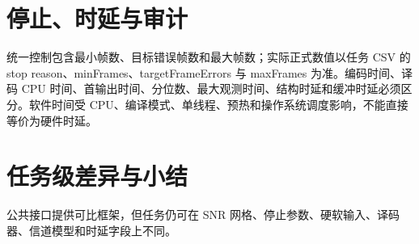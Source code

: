 \section{停止、时延与审计}
统一控制包含最小帧数、目标错误帧数和最大帧数；实际正式数值以任务 CSV 的 stop reason、minFrames、targetFrameErrors 与 maxFrames 为准。编码时间、译码 CPU 时间、首输出时间、分位数、最大观测时间、结构时延和缓冲时延必须区分。软件时间受 CPU、编译模式、单线程、预热和操作系统调度影响，不能直接等价为硬件时延。
\section{任务级差异与小结}
公共接口提供可比框架，但任务仍可在 SNR 网格、停止参数、硬软输入、译码器、信道模型和时延字段上不同。

